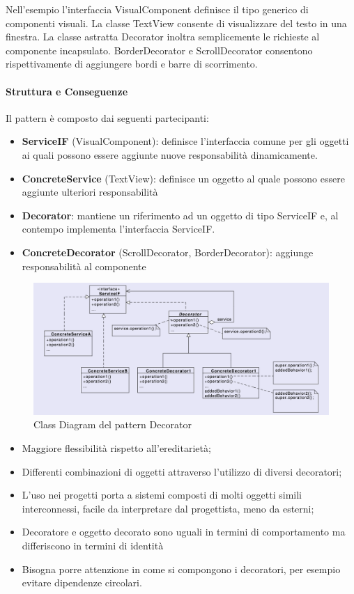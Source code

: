 Nell'esempio l'interfaccia VisualComponent definisce il tipo generico di componenti visuali. La classe TextView consente di visualizzare del testo in una finestra. La classe astratta Decorator inoltra semplicemente le richieste al componente incapsulato. BorderDecorator e ScrollDecorator consentono rispettivamente di aggiungere bordi e barre di scorrimento.

\paragraph{Struttura e Conseguenze} Il pattern è composto dai seguenti partecipanti:
\begin{itemize}
    \item \textbf{ServiceIF} (VisualComponent): definisce l'interfaccia comune per gli oggetti ai quali possono essere aggiunte nuove responsabilità dinamicamente.
    \item \textbf{ConcreteService} (TextView): definisce un oggetto al quale possono essere aggiunte ulteriori responsabilità
    \item \textbf{Decorator}: mantiene un riferimento ad un oggetto di tipo ServiceIF e, al contempo implementa l'interfaccia ServiceIF.
    \item \textbf{ConcreteDecorator} (ScrollDecorator, BorderDecorator): aggiunge responsabilità al componente
\end{itemize}


\begin{figure}[H]
    \centering
    \includegraphics[width=1\linewidth]{assets/pattern/decorator/decorator-struttura.png}
    \caption{Class Diagram del pattern Decorator}
\end{figure}

\begin{itemize}
    \item Maggiore flessibilità rispetto all'ereditarietà;
    \item Differenti combinazioni di oggetti attraverso l'utilizzo di diversi decoratori;
    \item L'uso nei progetti porta a sistemi composti di molti oggetti simili interconnessi, facile da interpretare dal progettista, meno da esterni;
    \item Decoratore e oggetto decorato sono uguali in termini di comportamento ma differiscono in termini di identità
    \item Bisogna porre attenzione in come si compongono i decoratori, per esempio evitare dipendenze circolari.
\end{itemize}


